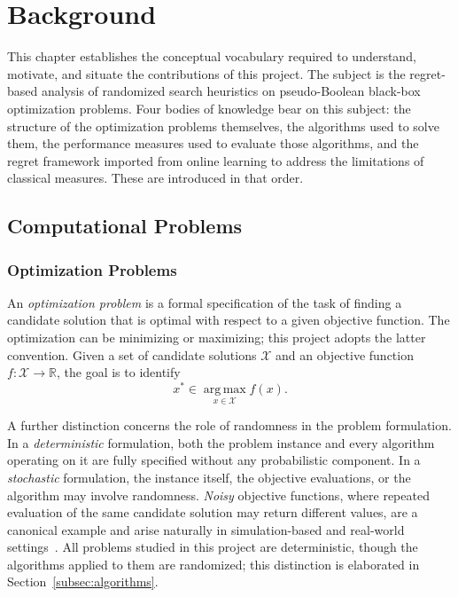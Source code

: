 \chapter{Background}
\label{cha:bg}
This chapter establishes the conceptual vocabulary required to
understand, motivate, and situate the contributions of this project.
The subject is the regret-based analysis of randomized search
heuristics on pseudo-Boolean black-box optimization problems. Four
bodies of knowledge bear on this subject: the structure of the
optimization problems themselves, the algorithms used to solve them,
the performance measures used to evaluate those algorithms, and the
regret framework imported from online learning to address the
limitations of classical measures. These are introduced in that order.

\section{Computational Problems}

\subsection{Optimization Problems}

An \textit{optimization problem} is a formal specification of the task of
finding a candidate solution that is optimal with respect to a given
objective function. The optimization can be minimizing or maximizing;
this project adopts the latter convention. Given a set of candidate solutions
$\mathcal{X}$ and an objective function $f : \mathcal{X} \to \mathbb{R}$,
the goal is to identify
\[
  x^* \in \operatorname*{arg\,max}_{x \in \mathcal{X}} f(x).
\]

A further distinction concerns the role of randomness in the problem
formulation. In a \textit{deterministic} formulation, both the problem
instance and every algorithm operating on it are fully specified without
any probabilistic component. In a \textit{stochastic} formulation, the
instance itself, the objective evaluations, or the algorithm may involve
randomness. \textit{Noisy} objective functions, where repeated evaluation
of the same candidate solution may return different values, are a canonical
example and arise naturally in simulation-based and real-world
settings~\cite{liu_primer_2020}. All problems studied in this project are
deterministic, though the algorithms applied to them are randomized; this
distinction is elaborated in Section~\ref{subsec:algorithms}.

